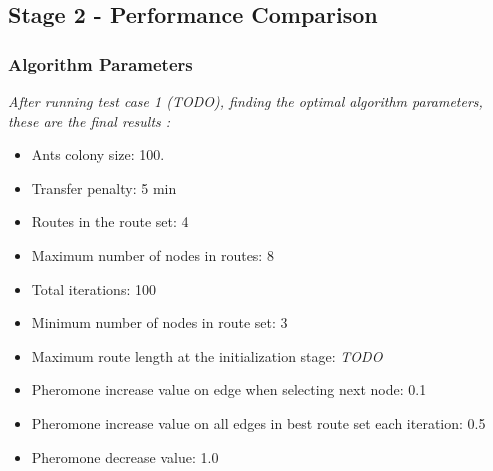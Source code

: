 \subsection{Stage 2 - Performance Comparison}

\subsubsection{Algorithm Parameters}
\emph{\color{red} After running test case 1 (TODO), finding the optimal algorithm parameters, these are the final results :}

\begin{itemize}
\item Ants colony size: 100.
\item Transfer penalty: 5 min
\item Routes in the route set: 4
\item Maximum number of nodes in routes: 8
\item Total iterations: 100
\item Minimum number of nodes in route set: 3
\item Maximum route length at the initialization stage: \emph{\color{red} TODO}
\item Pheromone increase value on edge when selecting next node: 0.1
\item Pheromone increase value on all edges in best route set each iteration: 0.5
\item Pheromone decrease value: 1.0
\end{itemize}